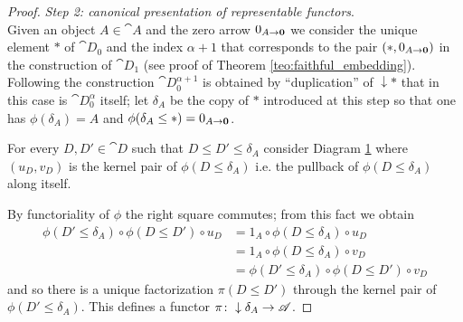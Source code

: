 \begin{proof}
  \noindent\emph{Step 2: canonical presentation of representable functors}.\\

  \noindent Given an object \(A\in\cat{A}\) and the zero arrow \(0_{A\to{\bf 0}}\) we consider the unique element \(*\) of \(\cat{D}_0\) and the index \(\alpha + 1\) that corresponds to the pair \((*, 0_{A\to{\bf 0}})\) in the construction of \(\cat{D}_1\) (see proof of Theorem \ref{teo:faithful_embedding}). Following the construction \(\cat{D}_0^{\alpha+1}\) is obtained by ``duplication'' of \(\downarrow *\) that in this case is \(\cat{D}_0^\alpha\) itself; let \(\delta_A\) be the copy of \(*\) introduced at this step so that one has \(\phi(\delta_A) = A\) and \(\phi(\delta_A\leq *) = 0_{A\to{\bf 0}}\).

  For every \(D,D'\in\cat{D}\) such that \(D\leq D'\leq\delta_A\) consider Diagram \ref{diagram:define_pi} where \((u_D, v_D)\) is the kernel pair of \(\phi(D\leq\delta_A)\) i.e. the pullback of \(\phi(D\leq\delta_A)\) along itself.
  \begin{figure}[h]
    \begin{center}
    \end{center}
    \caption{}
    \label{diagram:define_pi}
  \end{figure}
  \noindent By functoriality of \(\phi\) the right square commutes; from this fact we obtain
  \begin{align*}
    \phi(D'\leq\delta_A)\circ\phi(D\leq D')\circ u_D &= 1_A\circ\phi(D\leq\delta_A)\circ u_D\\
                                                     &= 1_A\circ\phi(D\leq\delta_A)\circ v_D\\
                                                     &= \phi(D'\leq\delta_A)\circ\phi(D\leq D')\circ v_D
  \end{align*}
  and so there is a unique factorization \(\pi(D\leq D')\) through the kernel pair of \(\phi(D'\leq\delta_A)\). This defines a functor \(\pi\colon \downarrow\delta_A\to {\mathscr A}\).


\end{proof}
